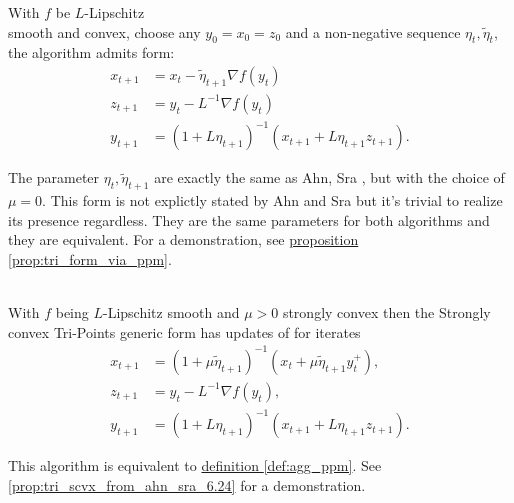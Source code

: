 \documentclass[12pt]{article}
\begin{document}
            \begin{definition}\label{def:agg_tri}
                With $f$ be $L$-Lipschitz \\ 
                smooth and convex, choose any $y_0 = x_0=z_0$ and a non-negative sequence $\eta_t, \tilde\eta_t$, the algorithm admits form: 
                \begin{align*}
                    x_{t + 1} &= x_t - \tilde \eta_{t + 1} \nabla f(y_t) 
                    \\
                    z_{t + 1} &= y_t - L^{-1} \nabla f(y_t) 
                    \\
                    y_{t + 1} &= 
                    (1 + L\eta_{t + 1})^{-1}
                    (
                    x_{t + 1} + L\eta_{t + 1}z_{t + 1}
                    ). 
                \end{align*}
            \end{definition}
            \begin{remark}
                The parameter $\eta_t, \tilde\eta_{t + 1}$ are exactly the same as Ahn, Sra \cite[(6.24)]{ahn_understanding_2022}, but with the choice of $\mu = 0$. 
                This form is not explictly stated by Ahn and Sra but it's trivial to realize its presence regardless. 
                They are the same parameters for both algorithms and they are equivalent. 
                For a demonstration, see 
                \hyperref[prop:tri_form_via_ppm]{proposition \ref*{prop:tri_form_via_ppm}}. 
            \end{remark}

            \begin{definition}
                \quad \\
                With $f$ being $L$-Lipschitz smooth and $\mu > 0$ strongly convex then the Strongly convex Tri-Points generic form has updates of for iterates
                \begin{align*}
                    x_{t + 1} &= (1 + \mu\tilde \eta_{t + 1})^{-1}(x_t + \mu\tilde\eta_{t + 1}y_t^+), 
                    \\
                    z_{t + 1} &= y_t - L^{-1}\nabla f(y_t), 
                    \\
                    y_{t + 1} &= (1 + L\eta_{t + 1})^{-1}(x_{t + 1} + L\eta_{t + 1}z_{t +1}). 
                \end{align*}
            \end{definition}
            \begin{remark}
                This algorithm is equivalent to 
                \hyperref[def:agg_ppm]{definition \ref*{def:agg_ppm}}. 
                See \ref*{prop:tri_scvx_from_ahn_sra_6.24} for a demonstration. 
            \end{remark}
\end{document}
